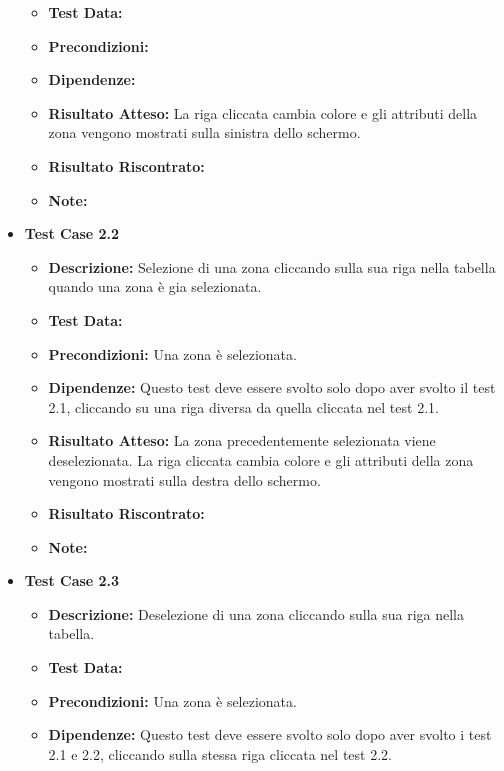 \begin{itemize}
\begin{itemize}
                    \item \textbf{Test Data:}
                    \item \textbf{Precondizioni:}
                    \item \textbf{Dipendenze:}
                    \item \textbf{Risultato Atteso:} La riga cliccata cambia colore e gli attributi della zona vengono mostrati sulla sinistra dello schermo.
                    \item \textbf{Risultato Riscontrato:}
                    \item \textbf{Note:}
                \end{itemize}
            \item \textbf{Test Case 2.2}
                \begin{itemize}
                    \item \textbf{Descrizione:} Selezione di una zona cliccando sulla sua riga nella tabella quando una zona è gia selezionata.
                    \item \textbf{Test Data:}
                    \item \textbf{Precondizioni:} Una zona è selezionata.
                    \item \textbf{Dipendenze:} Questo test deve essere svolto solo dopo aver svolto il test 2.1, cliccando su una riga diversa da quella cliccata nel test 2.1.
                    \item \textbf{Risultato Atteso:} La zona precedentemente selezionata viene deselezionata. La riga cliccata cambia colore e gli attributi della zona vengono mostrati sulla destra dello schermo.
                    \item \textbf{Risultato Riscontrato:}
                    \item \textbf{Note:}
                \end{itemize}
            \item \textbf{Test Case 2.3}
                \begin{itemize}
                    \item \textbf{Descrizione:} Deselezione di una zona cliccando sulla sua riga nella tabella.
                    \item \textbf{Test Data:}
                    \item \textbf{Precondizioni:} Una zona è selezionata.
                    \item \textbf{Dipendenze:} Questo test deve essere svolto solo dopo aver svolto i test 2.1 e 2.2, cliccando sulla stessa riga cliccata nel test 2.2.

\end{itemize}
\end{itemize}
